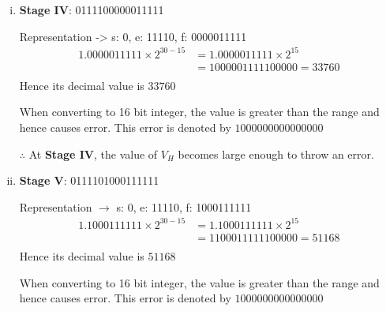 \documentclass{article}
\begin{document}
\begin{enumerate}[(i)]
\item\label{item:3c4} \textbf{Stage IV}: 0111100000011111\newline

  Representation -> s: 0, e: 11110, f: 0000011111
  \begin{align*}
    1.0000011111 \times 2^{30 - 15} &= 1.0000011111 \times 2^{15}\\
    &= 1000001111100000 = 33760\\
  \end{align*}
  Hence its decimal value is $\boxed{33760}$\newline\newline

  When converting to 16 bit integer, the value is greater than the range and hence causes error. This error is denoted by $\boxed{1000000000000000}$\newline

  $\therefore$ At \textbf{Stage IV}, the value of $V_H$ becomes large enough to throw an error.\newline\newline

\item\label{item:3c5} \textbf{Stage V}: 0111101000111111\newline

  Representation $\rightarrow$ s: 0, e: 11110, f: 1000111111
  \begin{align*}
    1.1000111111 \times 2^{30 - 15} &= 1.1000111111 \times 2^{15}\\
    &= 1100011111100000 = 51168\\
  \end{align*}
  Hence its decimal value is $\boxed{51168}$\newline\newline

  When converting to 16 bit integer, the value is greater than the range and hence causes error. This error is denoted by $\boxed{1000000000000000}$

\end{enumerate}
\end{document}
